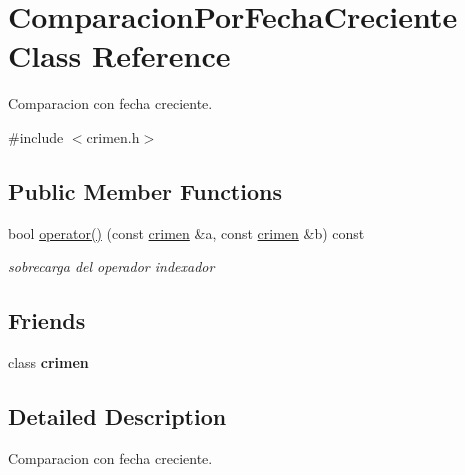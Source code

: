\hypertarget{classComparacionPorFechaCreciente}{\section{Comparacion\-Por\-Fecha\-Creciente Class Reference}
\label{classComparacionPorFechaCreciente}
}


Comparacion con fecha creciente.  




{\ttfamily \#include $<$crimen.\-h$>$}

\subsection*{Public Member Functions}
\begin{DoxyCompactItemize}
\item 
bool \hyperlink{classComparacionPorFechaCreciente_a0f33bbee8b5fa39c84edabc71d803465}{operator()} (const \hyperlink{classcrimen}{crimen} \&a, const \hyperlink{classcrimen}{crimen} \&b) const 
\begin{DoxyCompactList}\small\item\em sobrecarga del operador indexador \end{DoxyCompactList}\end{DoxyCompactItemize}
\subsection*{Friends}
\begin{DoxyCompactItemize}
\item 
\hypertarget{classComparacionPorFechaCreciente_a95cf0cce33343b561a43ff7566515870}{class {\bfseries crimen}}\label{classComparacionPorFechaCreciente_a95cf0cce33343b561a43ff7566515870}

\end{DoxyCompactItemize}


\subsection{Detailed Description}
Comparacion con fecha creciente. 

